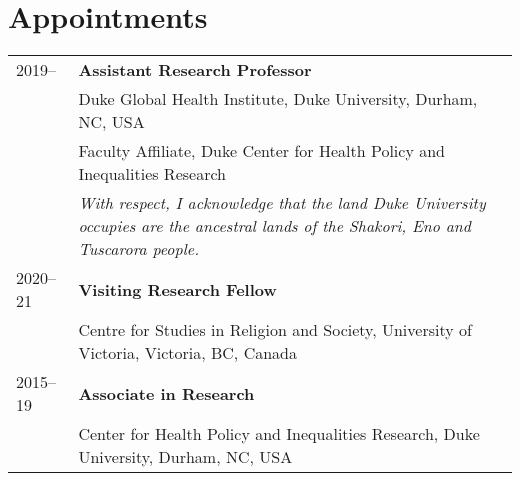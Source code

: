 \vspace{3ex}
\section*{Appointments}
\begin{longtable}{p{} p{}}
2019-- & \textbf{Assistant Research Professor}\\
		             & Duke Global Health Institute, Duke University, Durham, NC, USA \\
		             & Faculty Affiliate, Duke Center for Health Policy and Inequalities Research\\
		             & \emph{With respect, I  acknowledge that the land Duke University occupies are the ancestral lands of the Shakori, Eno and Tuscarora people.}\\
2020--21 & \textbf{Visiting Research Fellow}\\
	& Centre for Studies in Religion and Society, University of Victoria, Victoria, BC, Canada \\
	2015--19 & \textbf{Associate in Research}\\
	& Center for Health Policy and Inequalities Research, Duke University, Durham, NC, USA \\
\end{longtable}